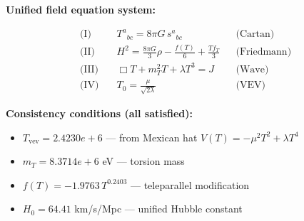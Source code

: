 
\textbf{Unified field equation system:}

\begin{align}
  \text{(I)} \quad & T^a{}_{bc} = 8\pi G \, s^a{}_{bc} && \text{(Cartan)} \\
  \text{(II)} \quad & H^2 = \frac{8\pi G}{3}\rho - \frac{f(T)}{6} + \frac{Tf_T}{3} && \text{(Friedmann)} \\
  \text{(III)} \quad & \Box T + m_T^2 T + \lambda T^3 = J && \text{(Wave)} \\
  \text{(IV)} \quad & T_0 = \frac{\mu}{\sqrt{2\lambda}} && \text{(VEV)}
\end{align}

\textbf{Consistency conditions (all satisfied):}
\begin{itemize}
  \item $T_{\text{vev}} = 2.4230e+6$ — from Mexican hat $V(T) = -\mu^2 T^2 + \lambda T^4$
  \item $m_T = 8.3714e+6$ eV — torsion mass
  \item $f(T) = -1.9763 \, T^{0.2403}$ — teleparallel modification
  \item $H_0 = 64.41$ km/s/Mpc — unified Hubble constant
\end{itemize}
